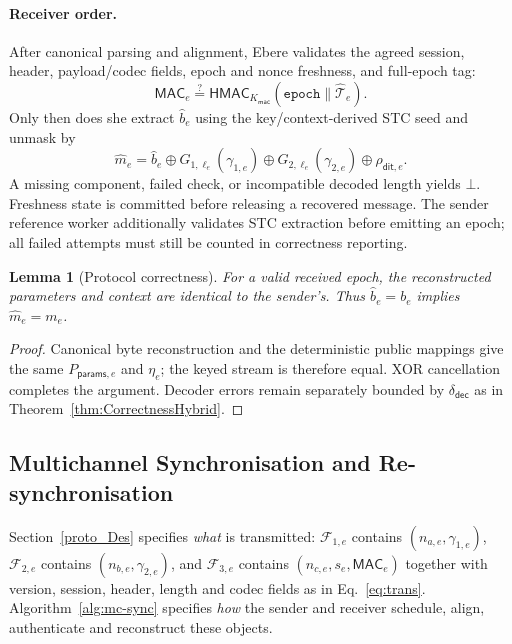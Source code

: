 \documentclass[pdflatex,sn-mathphys-num]{sn-jnl}%
\newtheorem{lemma}{Lemma}
\theoremstyle{definition}
\theoremstyle{game}
\theoremstyle{thmstyleone}%
\theoremstyle{thmstyletwo}%
\theoremstyle{thmstylethree}%
\begin{document}
\paragraph{Receiver order.}\label{protocol:decodingverification}
After canonical parsing and alignment, Ebere validates the agreed session,
header, payload/codec fields, epoch and nonce freshness, and full-epoch tag:
\begin{equation}\label{MAC Verifi}
\mathsf{MAC}_e\stackrel{?}{=}
 \mathsf{HMAC}_{K_{\mathsf{mac}}}(\texttt{epoch}\parallel\widehat{\mathcal T}_e).
\end{equation}
Only then does she extract $\widehat b_e$ using the key/context-derived STC
seed and unmask by
\begin{equation}\label{unmasked_proto_qim}
\widehat m_e=\widehat b_e\oplus G_{1,\ell_e}(\gamma_{1,e})
 \oplus G_{2,\ell_e}(\gamma_{2,e})\oplus\rho_{\mathsf{dit},e}.
\end{equation}
A missing component, failed check, or incompatible decoded length yields $\bot$.
Freshness state is committed before releasing a recovered message. The sender
reference worker additionally validates STC extraction before emitting an epoch;
all failed attempts must still be counted in correctness reporting.

\begin{lemma}[Protocol correctness]\label{lem:protocol-correctness}
For a valid received epoch, the reconstructed parameters and context are
identical to the sender's. Thus $\widehat b_e=b_e$ implies $\widehat m_e=m_e$.
\end{lemma}
\begin{proof}
Canonical byte reconstruction and the deterministic public mappings give the
same $P_{\mathsf{params},e}$ and $\eta_e$; the keyed stream is therefore equal.
XOR cancellation completes the argument. Decoder errors remain separately
bounded by $\delta_{\mathsf{dec}}$ as in Theorem~\ref{thm:CorrectnessHybrid}.
\end{proof}

\subsection{Multichannel Synchronisation and Re-synchronisation}
\label{subsec:algo-sync}
Section~\ref{proto_Des} specifies \emph{what} is transmitted:
$\mathcal F_{1,e}$ contains $(n_{a,e},\gamma_{1,e})$,
$\mathcal F_{2,e}$ contains $(n_{b,e},\gamma_{2,e})$, and
$\mathcal F_{3,e}$ contains $(n_{c,e},s_e,\mathsf{MAC}_e)$ together with
version, session, header, length and codec fields as in Eq.~\eqref{eq:trans}.
Algorithm~\ref{alg:mc-sync} specifies \emph{how} the sender and receiver
schedule, align, authenticate and reconstruct these objects.
\end{document}

